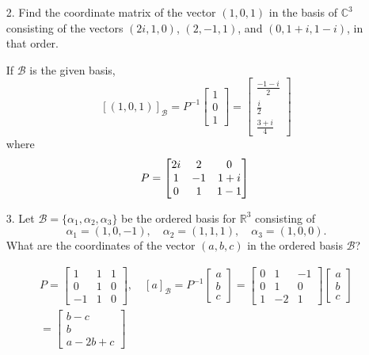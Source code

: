 \documentclass{article}
\begin{document}
\begin{enumerate}[listparindent=\parindent]
\item[2.] Find the coordinate matrix of the vector \((1, 0, 1)\) in the basis of \(\mathbb{C}^3\)
    consisting of the vectors \((2i, 1, 0)\), \((2, -1, 1)\), and \((0, 1 + i, 1 - i)\), in that order.

    If \(\mathcal{B}\) is the given basis,
    \[
        [(1, 0, 1)]_\mathcal{B} =
        P^{-1}\begin{bmatrix} 1 \\ 0 \\ 1 \end{bmatrix} =
        \boxed {
            \begin{bmatrix} \frac{-1 - i}{2} \\ \frac{i}{2} \\ \frac{3 + i}{4} \end{bmatrix}
        }
    \]
    where
    \[
        P = \begin{bmatrix}
            2i & 2 & 0 \\
            1 & -1 & 1 + i \\
            0 & 1 & 1 - 1
        \end{bmatrix} \\
    \]

\item[3.] Let \(\mathcal{B} = \{\alpha_1, \alpha_2, \alpha_3\}\) be the ordered basis for \(\mathbb{R}^3\) consisting of
    \[
        \alpha_1 = (1, 0, -1),\quad \alpha_2 = (1, 1, 1),\quad \alpha_3 = (1, 0, 0).
    \]
    What are the coordinates of the vector \((a, b, c)\) in the ordered basis \(\mathcal{B}\)?

    \begin{gather*}
        P = \begin{bmatrix}
            1 & 1 & 1 \\
            0 & 1 & 0 \\
            -1 & 1 & 0
        \end{bmatrix}, \quad
        [a]_\mathcal{B} = P^{-1}\begin{bmatrix} a \\ b \\ c \end{bmatrix}
        = \begin{bmatrix}
            0 & 1 & -1 \\
            0 & 1 & 0 \\
            1 & -2 & 1
        \end{bmatrix}
        \begin{bmatrix} a \\ b \\ c \end{bmatrix} \\
        = \begin{bmatrix} b - c \\ b \\ a - 2b + c \end{bmatrix}
    \end{gather*}


\end{enumerate}
\end{document}
